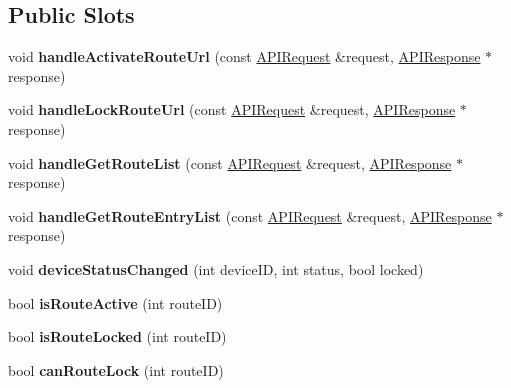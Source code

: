 \subsection*{Public Slots}
\begin{DoxyCompactItemize}
\item 
\mbox{\label{class_a_p_i_route_a23f1b30a95e806760968daf23e2b3fa1}} 
void {\bfseries handle\+Activate\+Route\+Url} (const \hyperlink{class_a_p_i_request}{A\+P\+I\+Request} \&request, \hyperlink{class_a_p_i_response}{A\+P\+I\+Response} $\ast$response)
\item 
\mbox{\label{class_a_p_i_route_a2edf94cf41f8fba5b1ed5f5eca217968}} 
void {\bfseries handle\+Lock\+Route\+Url} (const \hyperlink{class_a_p_i_request}{A\+P\+I\+Request} \&request, \hyperlink{class_a_p_i_response}{A\+P\+I\+Response} $\ast$response)
\item 
\mbox{\label{class_a_p_i_route_a62f9b2e4addb8b60087a02a3e93c1abf}} 
void {\bfseries handle\+Get\+Route\+List} (const \hyperlink{class_a_p_i_request}{A\+P\+I\+Request} \&request, \hyperlink{class_a_p_i_response}{A\+P\+I\+Response} $\ast$response)
\item 
\mbox{\label{class_a_p_i_route_a95f38f3fb39801deba8d4a39e14686d2}} 
void {\bfseries handle\+Get\+Route\+Entry\+List} (const \hyperlink{class_a_p_i_request}{A\+P\+I\+Request} \&request, \hyperlink{class_a_p_i_response}{A\+P\+I\+Response} $\ast$response)
\item 
\mbox{\label{class_a_p_i_route_a2ddf0d77318dcb66acc7d754c81151b3}} 
void {\bfseries device\+Status\+Changed} (int device\+ID, int status, bool locked)
\item 
\mbox{\label{class_a_p_i_route_afbd5b3b86ddacee31d16330de4d069df}} 
bool {\bfseries is\+Route\+Active} (int route\+ID)
\item 
\mbox{\label{class_a_p_i_route_a78e979b1ae56db76fb77de3cb8e54da9}} 
bool {\bfseries is\+Route\+Locked} (int route\+ID)
\item 
\mbox{\label{class_a_p_i_route_ab02063d3a9335d9e3e3ad9160dbb626b}} 
bool {\bfseries can\+Route\+Lock} (int route\+ID)
\end{DoxyCompactItemize}
